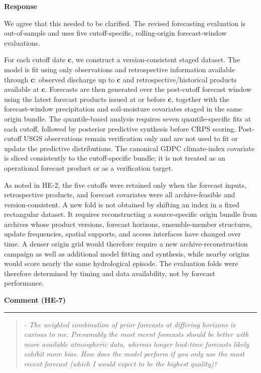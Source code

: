 \documentclass[11pt,letterpaper]{article}
\newcommand{\commentheading}[1]{%
  \vspace{6pt}\noindent\textbf{Comment (#1)}\par
  \vspace{2pt}\hrule\vspace{6pt}
}
\newenvironment{commentblock}{\begin{quote}\small\itshape}{\end{quote}}
\newcommand{\responseheading}{%
  \vspace{2pt}\noindent\textbf{Response}\par
}
\newenvironment{responsebox}{\begin{mdframed}[style=plainbox]}{\end{mdframed}}
\newcommand{\HE}[1]{HE-#1}
\begin{document}
\responseheading
\begin{responsebox}
We agree that this needed to be clarified. The revised forecasting evaluation is out-of-sample and uses five cutoff-specific, rolling-origin forecast-window evaluations.

For each cutoff date \(\textbf{c}\), we construct a version-consistent staged dataset. The model is fit using only observations and retrospective information available through \(\textbf{c}\): observed discharge up to \(\textbf{c}\) and retrospective/historical products available at \(\textbf{c}\). Forecasts are then generated over the post-cutoff forecast window using the latest forecast products issued at or before \(\textbf{c}\), together with the forecast-window precipitation and soil-moisture covariates staged in the same origin bundle. The quantile-based analysis requires seven quantile-specific fits at each cutoff, followed by posterior predictive synthesis before CRPS scoring. Post-cutoff USGS observations remain verification only and are not used to fit or update the predictive distributions. The canonical GDPC climate-index covariate is sliced consistently to the cutoff-specific bundle; it is not treated as an operational forecast product or as a verification target.

As noted in HE-2, the five cutoffs were retained only when the forecast inputs, retrospective products, and forecast covariates were all archive-feasible and version-consistent. A new fold is not obtained by shifting an index in a fixed rectangular dataset. It requires reconstructing a source-specific origin bundle from archives whose product versions, forecast horizons, ensemble-member structures, update frequencies, spatial supports, and access interfaces have changed over time. A denser origin grid would therefore require a new archive-reconstruction campaign as well as additional model fitting and synthesis, while nearby origins would score nearly the same hydrological episode. The evaluation folds were therefore determined by timing and data availability, not by forecast performance.

\end{responsebox}


\commentheading{\HE{7}}
\begin{commentblock}
- The weighted combination of prior forecasts at differing horizons is curious to me. Presumably the most recent forecasts should be better with more available atmospheric data, whereas longer lead-time forecasts likely exhibit more bias. How does the model perform if you only use the most recent forecast (which I would expect to be the highest quality)?
\end{commentblock}
\end{document}
